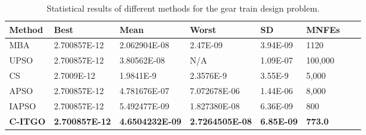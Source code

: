 
\begin{table*}[tp]
    \tiny
\begin{center}

\begin{tabular}{ P{2.0cm} P{2.0cm} P{2.0cm} P{2.0cm} P{2.0cm} P{2.0cm} P{2.0cm} P{2.0cm}  }
\hline
\textbf{Method} & \textbf{Best} & \textbf{Mean} & \textbf{Worst} & \textbf{SD} & \textbf{MNFEs} \\
\hline

MBA & 2.700857E-12 & 2.062904E-08 & 2.47E-09 & 3.94E-09 & 1120 \\
UPSO & 2.700857E-12 & 3.80562E-08 & N/A & 1.09E-07 & 100,000 \\
CS & 2.7009E-12 & 1.9841E-9 & 2.3576E-9 & 3.55E-9 & 5,000 \\
APSO & 2.700857E-12 & 4.781676E-07 & 7.072678E-06 & 1.44E-06 & 8,000 \\
IAPSO & 2.700857E-12 & 5.492477E-09 & 1.827380E-08 & 6.36E-09 & 800 \\
\textbf{C-ITGO} & \bf{2.700857E-12} & \bf{4.6504232E-09} & \bf{2.7264505E-08} & \bf{6.85E-09} & \bf{773.0} \\


\hline
\end{tabular}
\end{center}
\vspace*{-6mm}
\caption{Statistical results of different methods for the gear train design problem. \\[1em]}
\label{tab:GT}
\end{table*}

